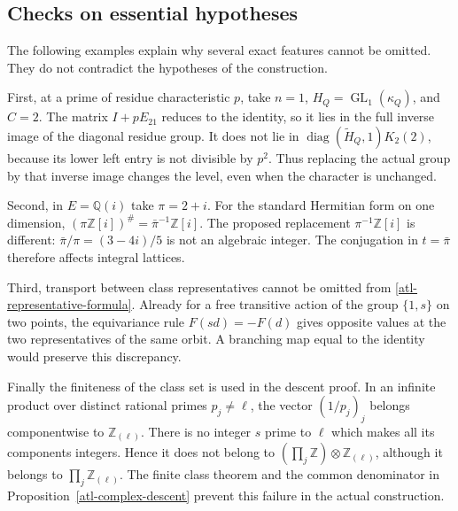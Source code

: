 \subsection{Checks on essential hypotheses}

The following examples explain why several exact
features cannot be omitted.  They do not contradict
the hypotheses of the construction.

First, at a prime of residue characteristic $p$,
take $n=1$, $H_Q=\operatorname{GL}_1(\kappa_Q)$, and
$C=2$.  The matrix $I+pE_{21}$ reduces to the identity,
so it lies in the full inverse image of the diagonal
residue group.  It does not lie in
$\operatorname{diag}(\widetilde H_Q,1)K_2(2)$, because
its lower left entry is not divisible by $p^2$.
Thus replacing the actual group by that inverse
image changes the level, even when the character
is unchanged.

Second, in $E=\mathbb Q(i)$ take $\pi=2+i$.
For the standard Hermitian form on one dimension,
$(\pi\mathbb Z[i])^\#=\bar\pi^{-1}\mathbb Z[i]$.
The proposed replacement $\pi^{-1}\mathbb Z[i]$
is different: $\bar\pi/\pi=(3-4i)/5$ is not an
algebraic integer.  The conjugation in $t=\bar\pi$
therefore affects integral lattices.

Third, transport between class representatives
cannot be omitted from
\eqref{atl-representative-formula}.  Already for a
free transitive action of the group $\{1,s\}$ on
two points, the equivariance rule $F(sd)=-F(d)$
gives opposite values at the two representatives
of the same orbit.  A branching map equal to the
identity would preserve this discrepancy.

Finally the finiteness of the class set is used in
the descent proof.  In an infinite product over
distinct rational primes $p_j\ne\ell$, the vector
$(1/p_j)_j$ belongs componentwise to $\mathbb Z_{(\ell)}$.
There is no integer $s$ prime to $\ell$ which makes
all its components integers.  Hence it does not
belong to $(\prod_j\mathbb Z)\otimes\mathbb Z_{(\ell)}$,
although it belongs to $\prod_j\mathbb Z_{(\ell)}$.
The finite class theorem and the common denominator
in Proposition~\ref{atl-complex-descent} prevent
this failure in the actual construction.


